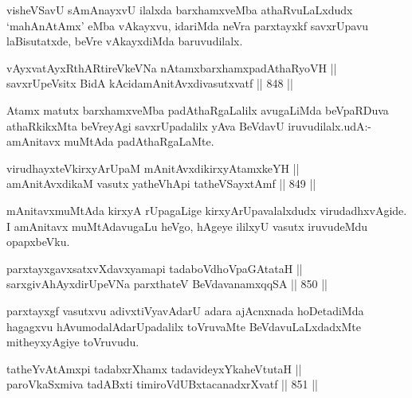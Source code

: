\begin{artha}
visheVSavU sAmAnayxvU ilalxda barxhamxveMba athaRvuLaLxdudx `mahAnAtAmx' eMba vAkayxvu, idariMda neVra parxtayxkf savxrUpavu laBisutatxde, beVre vAkayxdiMda baruvudilalx.
\end{artha}


\begin{shl}
vAyxvatAyxRthARtireVkeVNa nA\s \s tamxbarxhamxpadAthaRyoVH || \\
savxrUpeV\s sitx BidA kAcidamAnitAvxdivasutxvatf \hfill || 848 ||  
\end{shl}

\begin{artha}
Atamx matutx barxhamxveMba padAthaRgaLalilx avugaLiMda beVpaRDuva athaRkikxMta beVreyAgi savxrUpadalilx yAva BeVdavU iruvudilalx.udA:-amAnitavx muMtAda padAthaRgaLaMte.
\end{artha}


\begin{shl}
virudhayxteV\s kirxyArUpaM mAnitAvxdikirxyAtamxkeYH || \\
amAnitAvxdikaM vasutx yatheVhApi tatheVSayxtAmf \hfill || 849 ||  
\end{shl}

\begin{artha}
mAnitavxmuMtAda kirxyA rUpagaLige kirxyArUpavalalxdudx virudadhxvAgide. I amAnitavx muMtAdavugaLu heVgo, hAgeye ililxyU vasutx iruvudeMdu opapxbeVku.
\end{artha}

\begin{shl}
parxtayxgavxsatxvXdavxyamapi tadaboVdhoVpaGAtataH || \\
sarxgivAhAyxdirUpeVNa parxthateV BeVdavanamxqqSA \hfill || 850 ||  
\end{shl}

\begin{artha}
parxtayxgf vasutxvu adivxtiVyavAdarU adara ajAcnxnada hoDetadiMda hagagxvu hAvumodalAdarUpadalilx toVruvaMte BeVdavuLaLxdadxMte mitheyxyAgiye toVruvudu.
\end{artha}

\begin{shl}
tatheYvA\s \s tAmx\s pi tadabxrXhamx tadavideyxYkaheVtutaH || \\
paroVkaSxmiva tadABxti timiroVdUBxtacanadxrXvatf \hfill || 851 ||  
\end{shl}

